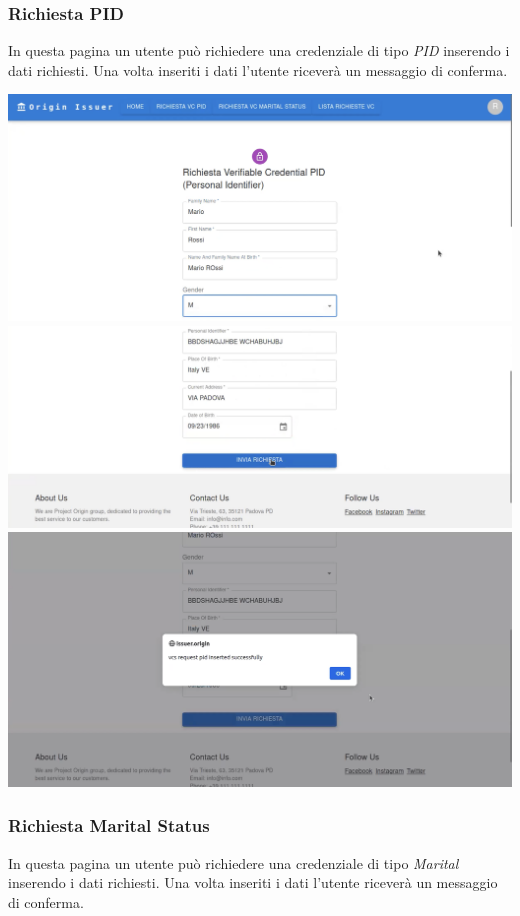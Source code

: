 \subsubsection{Richiesta PID}
In questa pagina un utente può richiedere una credenziale di tipo \textit{PID} inserendo i dati richiesti. Una volta inseriti i dati l'utente riceverà un messaggio di conferma.
\begin{center}
\includegraphics[scale = 0.2]{./res/img/issuer/richiestaPID/richiestaPID1.png}
\includegraphics[scale = 0.2]{./res/img/issuer/richiestaPID/richiestaPID2.png} 
\includegraphics[scale = 0.2]{./res/img/issuer/richiestaPID/richiestaPID3.png}
\end{center}

\subsubsection{Richiesta Marital Status}
In questa pagina un utente può richiedere una credenziale di tipo \textit{Marital} inserendo i dati richiesti. Una volta inseriti i dati l'utente riceverà un messaggio di conferma.

